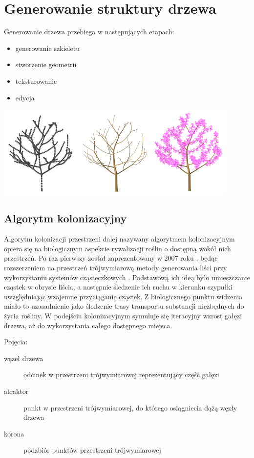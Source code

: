 \section{Generowanie struktury drzewa}
Generowanie drzewa przebiega w następujących etapach:
\begin{itemize}
\item generowanie szkieletu
\item stworzenie geometrii
\item teksturowanie
\item edycja
\end{itemize}
\begin{center}
	\includegraphics[width=120mm]{images/colonization/generation.png}
	\label{colonization_generation}
\end{center}
\subsection{Algorytm kolonizacyjny}
Algorytm kolonizacji przestrzeni dalej nazywany algorytmem kolonizacyjnym opiera się na biologicznym aspekcie rywalizacji roślin o dostępną wokół nich przestrzeń. 
Po raz pierwszy został zaprezentowany w 2007 roku \cite{spaceColonization}, będąc rozszerzeniem na przestrzeń trójwymiarową metody generowania liści przy wykorzystaniu systemów cząsteczkowych \cite{particleMethod}. 
Podstawową ich ideą było umieszczanie cząstek w obrysie liścia, a następnie śledzenie ich ruchu w kierunku szypułki uwzględniając wzajemne przyciąganie cząstek. 
Z biologicznego punktu widzenia miało to uzasadnienie jako śledzenie trasy transportu substancji niezbędnych do życia rośliny. 
W podejściu kolonizacyjnym symuluje się iteracyjny wzrost gałęzi drzewa, aż do wykorzystania całego dostępnego miejsca.

\newpage
Pojęcia:
\begin{description}
	\item[węzeł drzewa] odcinek w przestrzeni trójwymiarowej reprezentujący część gałęzi
	\item[atraktor] punkt w przestrzeni trójwymiarowej, do którego osiągniecia dążą węzły drzewa
	\item[korona] podzbiór punktów przestrzeni trójwymiarowej
\end{description}
